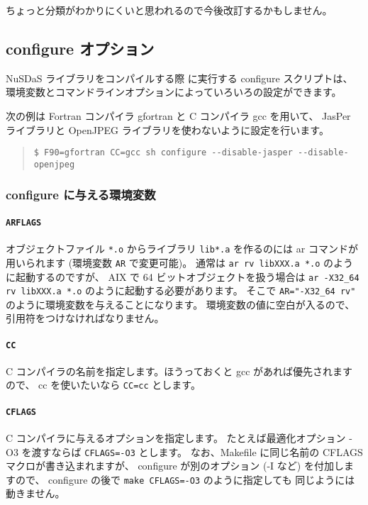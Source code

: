 ちょっと分類がわかりにくいと思われるので今後改訂するかもしません。

\subsection{configure オプション}
\label{sec:opts:configure}

NuSDaS ライブラリをコンパイルする際
に実行する configure スクリプトは、
環境変数とコマンドラインオプションによっていろいろの設定ができます。

次の例は Fortran コンパイラ gfortran と C コンパイラ gcc を用いて、
JasPer ライブラリと OpenJPEG ライブラリを使わないように設定を行います。

\begin{quote}
\begin{verbatim}
$ F90=gfortran CC=gcc sh configure --disable-jasper --disable-openjpeg
\end{verbatim}
\end{quote}

\subsubsection{configure に与える環境変数}

\paragraph{\tt ARFLAGS}
オブジェクトファイル \verb|*.o| からライブラリ \verb|lib*.a| を作るのには
ar コマンドが用いられます (環境変数 \verb|AR| で変更可能)。
通常は \verb|ar rv libXXX.a *.o| のように起動するのですが、
AIX で 64 ビットオブジェクトを扱う場合は
\verb|ar -X32_64 rv libXXX.a *.o| のように起動する必要があります。
そこで \verb|AR="-X32_64 rv"| のように環境変数を与えることになります。
環境変数の値に空白が入るので、引用符をつけなければなりません。

\paragraph{\tt CC}
C コンパイラの名前を指定します。ほうっておくと gcc があれば優先されます
ので、 cc を使いたいなら \verb|CC=cc| とします。

\paragraph{\tt CFLAGS}
C コンパイラに与えるオプションを指定します。 
たとえば最適化オプション -O3 を渡すならば \verb|CFLAGS=-O3| とします。
なお、Makefile に同じ名前の CFLAGS マクロが書き込まれますが、
configure が別のオプション (-I など) を付加しますので、
configure の後で \verb|make CFLAGS=-O3| のように指定しても
同じようには動きません。

